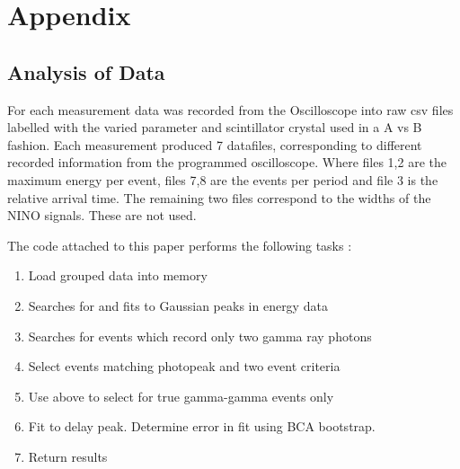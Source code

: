 \section*{Appendix}
\subsection{Analysis of Data}
For each measurement data was recorded from the Oscilloscope into raw csv files labelled with the varied parameter and scintillator crystal used in a A vs B fashion. Each measurement produced 7 datafiles, corresponding to different recorded information from the programmed oscilloscope. Where files 1,2 are the maximum energy per event, files 7,8 are the events per period and file 3 is the relative arrival time. The remaining two files correspond to the widths of the NINO signals. These are not used.

The code attached to this paper performs the following tasks : 

\begin{enumerate}
\item Load grouped data into memory
\item Searches for and fits to Gaussian peaks in energy data
\item Searches for events which record only two gamma ray photons
\item Select events matching photopeak and two event criteria
\item Use above to select for true gamma-gamma events only
\item Fit to delay peak. Determine error in fit using BCA bootstrap.
\item Return results
\end{enumerate}

